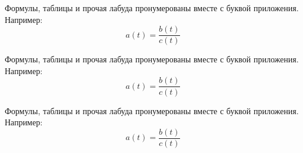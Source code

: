 \label{appendix_label1}

Формулы, таблицы и прочая лабуда пронумерованы вместе с буквой приложения. Например:
\begin{equation}
    a(t) = \frac{b(t)}{c(t)}
\end{equation}


\label{appendix_label2}

Формулы, таблицы и прочая лабуда пронумерованы вместе с буквой приложения. Например:
\begin{equation}
    a(t) = \frac{b(t)}{c(t)}
\end{equation}


\label{appendix_label3}

Формулы, таблицы и прочая лабуда пронумерованы вместе с буквой приложения. Например:
\begin{equation}
    a(t) = \frac{b(t)}{c(t)}
\end{equation}
